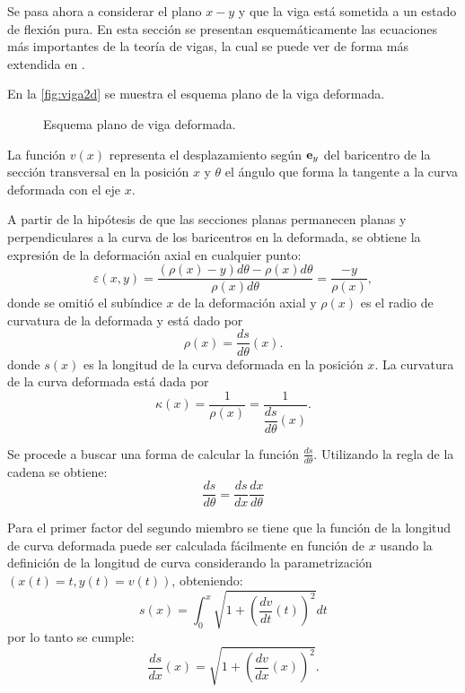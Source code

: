 Se pasa ahora a considerar el plano $x-y$ y que la viga está sometida a un estado de flexión pura. %
%
En esta sección se presentan esquemáticamente las ecuaciones más importantes de la teoría de vigas, la cual se puede ver de forma más extendida en \citep{Timoshenko1940a}. %

En la \autoref{fig:viga2d} se muestra el esquema plano de la viga deformada. %

\begin{figure}[htb]
	\centering
	\def\svgwidth{0.6\textwidth}
	
	\caption{Esquema plano de viga deformada.}
	\label{fig:viga2d}
\end{figure}
%
La función $v(x)$ representa el desplazamiento según ${\bf e}_y$ del baricentro de la sección transversal en la posición $x$ y $\theta$ el ángulo que forma la tangente a la curva deformada con el eje $x$. %
%

A partir de la hipótesis de que las secciones planas permanecen planas y perpendiculares a la curva de los baricentros en la deformada, se obtiene la expresión de la deformación axial en cualquier punto:
%
\begin{equation}
\varepsilon(x,y) = \frac{ (\rho(x) -y) d\theta - \rho(x) d \theta }{ \rho(x) d \theta} = \frac{-y}{\rho(x)},
\end{equation}
donde se omitió el subíndice $x$ de la deformación axial y $\rho(x)$ es el radio de curvatura de la deformada y está dado por
%
\begin{equation}
\rho(x) = \frac{ds}{d\theta}(x).
\end{equation}
%
donde $s(x)$ es la longitud de la curva deformada en la posición $x$.
%
La curvatura de la curva deformada está dada por
\begin{equation}
\kappa (x) = \frac{1}{\rho(x)} = \frac{1}{\dfrac{ds}{d \theta} (x)}.
\end{equation}

Se procede a buscar una forma de calcular la función $\frac{ds}{d\theta}$. %
Utilizando la regla de la cadena se obtiene:
%
\begin{equation}\label{eqn:dsdtheta}
\dfrac{ds}{d \theta} = \frac{ds}{dx} \frac{dx}{d\theta}
\end{equation}


Para el primer factor del segundo miembro se tiene que la función de la longitud de curva deformada puede ser calculada fácilmente en función de $x$ usando la definición de la longitud de curva considerando la parametrización $(x(t)=t,y(t)=v(t))$, obteniendo:
%
\begin{equation}
s(x) = \int_0^x \sqrt{1+  \left( \frac{d v}{d t}(t)\right)^2} dt
\end{equation}
%
por lo tanto se cumple:
\begin{equation}\label{eqn:dsdx}
\frac{ds}{dx} (x) = \sqrt{1+ \left( \frac{ d v}{d x}(x)  \right) ^2}.
\end{equation}

